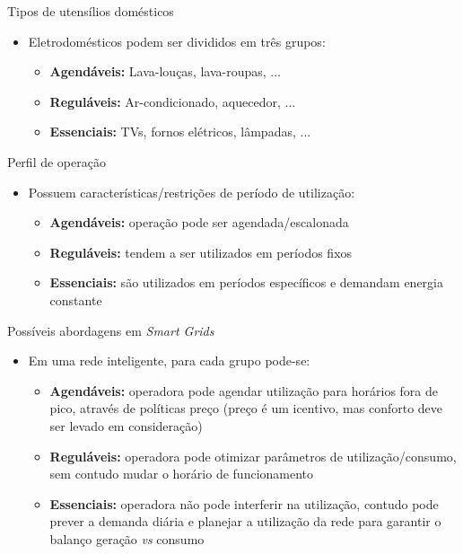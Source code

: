 \begin{frame}
  \begin{block}{Tipos de utensílios domésticos}
    \begin{itemize}
      \item Eletrodomésticos podem ser divididos em três grupos:
      \begin{itemize}
        \item \textbf{Agendáveis:} Lava-louças, lava-roupas, ...
        \item \textbf{Reguláveis:} Ar-condicionado, aquecedor, ...
        \item \textbf{Essenciais:} TVs, fornos elétricos, lâmpadas, ...
      \end{itemize}
    \end{itemize}
  \end{block}
  \pause
  \begin{block}{Perfil de operação}
    \begin{itemize}
      \item Possuem características/restrições de período de utilização:
      \begin{itemize}
        \item \textbf{Agendáveis:} operação pode ser agendada/escalonada
        \item \textbf{Reguláveis:} tendem a ser utilizados em períodos fixos
        \item \textbf{Essenciais:} são utilizados em períodos específicos
        e demandam energia constante
      \end{itemize}
    \end{itemize}
  \end{block}
\end{frame}

\begin{frame}
  \begin{block}{Possíveis abordagens em \textit{Smart Grids}}
    \begin{itemize}
      \item Em uma rede inteligente, para cada grupo pode-se:
      \begin{itemize}
        \item \textbf{Agendáveis:} operadora pode agendar utilização para
        horários fora de pico, através de políticas preço (preço é um icentivo,
        mas conforto deve ser levado em consideração)
        \item \textbf{Reguláveis:} operadora pode otimizar parâmetros de
        utilização/consumo, sem contudo mudar o horário de funcionamento
        \item \textbf{Essenciais:} operadora não pode interferir na utilização,
        contudo pode prever a demanda diária e planejar a utilização da rede
        para garantir o balanço geração \textit{vs} consumo
      \end{itemize}
    \end{itemize}
  \end{block}
\end{frame}

